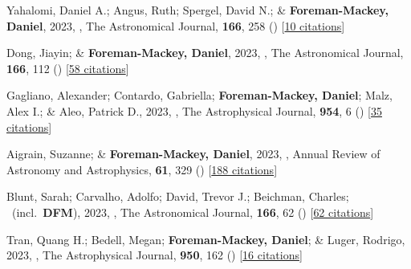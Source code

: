 \item[{\color{numcolor}\scriptsize100}] Yahalomi, Daniel A.; Angus, Ruth; Spergel, David N.; \& \textbf{Foreman-Mackey, Daniel}, 2023, , The Astronomical Journal, \textbf{166}, 258 () [\href{https://ui.adsabs.harvard.edu/abs/2023AJ....166..258Y}{10 citations}]

\item[{\color{numcolor}\scriptsize99}] Dong, Jiayin; \& \textbf{Foreman-Mackey, Daniel}, 2023, , The Astronomical Journal, \textbf{166}, 112 () [\href{https://ui.adsabs.harvard.edu/abs/2023AJ....166..112D}{58 citations}]

\item[{\color{numcolor}\scriptsize98}] Gagliano, Alexander; Contardo, Gabriella; \textbf{Foreman-Mackey, Daniel}; Malz, Alex I.; \& Aleo, Patrick D., 2023, , The Astrophysical Journal, \textbf{954}, 6 () [\href{https://ui.adsabs.harvard.edu/abs/2023ApJ...954....6G}{35 citations}]

\item[{\color{numcolor}\scriptsize97}] Aigrain, Suzanne; \& \textbf{Foreman-Mackey, Daniel}, 2023, , Annual Review of Astronomy and Astrophysics, \textbf{61}, 329 () [\href{https://ui.adsabs.harvard.edu/abs/2023ARA&A..61..329A}{188 citations}]

\item[{\color{numcolor}\scriptsize96}] Blunt, Sarah; Carvalho, Adolfo; David, Trevor J.; Beichman, Charles; \etal\ (incl.\ \textbf{DFM}), 2023, , The Astronomical Journal, \textbf{166}, 62 () [\href{https://ui.adsabs.harvard.edu/abs/2023AJ....166...62B}{62 citations}]

\item[{\color{numcolor}\scriptsize95}] Tran, Quang H.; Bedell, Megan; \textbf{Foreman-Mackey, Daniel}; \& Luger, Rodrigo, 2023, , The Astrophysical Journal, \textbf{950}, 162 () [\href{https://ui.adsabs.harvard.edu/abs/2023ApJ...950..162T}{16 citations}]

